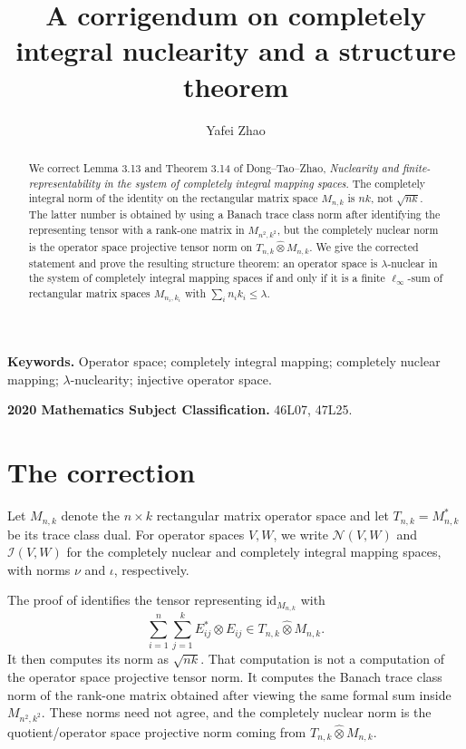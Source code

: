 \documentclass[11pt]{article}
\title{A corrigendum on completely integral nuclearity and a structure theorem}
\author{Yafei Zhao}
\date{}
\theoremstyle{remark}
\newcommand{\id}{\mathrm{id}}
\newcommand{\CN}{\mathcal N}
\newcommand{\CI}{\mathcal I}
\newcommand{\ohat}{\widehat{\otimes}}
\begin{document}
\maketitle

\begin{abstract}
We correct Lemma 3.13 and Theorem 3.14 of Dong--Tao--Zhao,
\emph{Nuclearity and finite-representability in the system of completely
integral mapping spaces}.  The completely integral norm of the identity
on the rectangular matrix space \(M_{n,k}\) is \(nk\), not \(\sqrt{nk}\).
The latter number is obtained by using a Banach trace class norm after
identifying the representing tensor with a rank-one matrix in
\(M_{n^2,k^2}\), but the completely nuclear norm is the operator space
projective tensor norm on \(T_{n,k}\ohat M_{n,k}\).  We give the corrected
statement and prove the resulting structure theorem: an operator space is
\(\lambda\)-nuclear in the system of completely integral mapping spaces
if and only if it is a finite \(\ell_\infty\)-sum of rectangular matrix
spaces \(M_{n_i,k_i}\) with \(\sum_i n_i k_i\leq \lambda\).
\end{abstract}

\noindent\textbf{Keywords.} Operator space; completely integral mapping;
completely nuclear mapping; \(\lambda\)-nuclearity; injective operator space.

\medskip
\noindent\textbf{2020 Mathematics Subject Classification.} 46L07, 47L25.

\section{The correction}

Let \(M_{n,k}\) denote the \(n\times k\) rectangular matrix operator space
and let \(T_{n,k}=M_{n,k}^{*}\) be its trace class dual.  For operator
spaces \(V,W\), we write \(\CN(V,W)\) and \(\CI(V,W)\) for the completely
nuclear and completely integral mapping spaces, with norms \(\nu\) and
\(\iota\), respectively.

The proof of \cite[Lemma 3.13]{DTZ} identifies the tensor representing
\(\id_{M_{n,k}}\) with
\[
        \sum_{i=1}^{n}\sum_{j=1}^{k} E_{ij}^{*}\otimes E_{ij}
        \in T_{n,k}\ohat M_{n,k}.
\]
It then computes its norm as \(\sqrt{nk}\).  That computation is not a
computation of the operator space projective tensor norm.  It computes the
Banach trace class norm of the rank-one matrix obtained after viewing the
same formal sum inside \(M_{n^2,k^2}\).  These norms need not agree, and
the completely nuclear norm is the quotient/operator space projective norm
coming from \(T_{n,k}\ohat M_{n,k}\).
\end{document}
